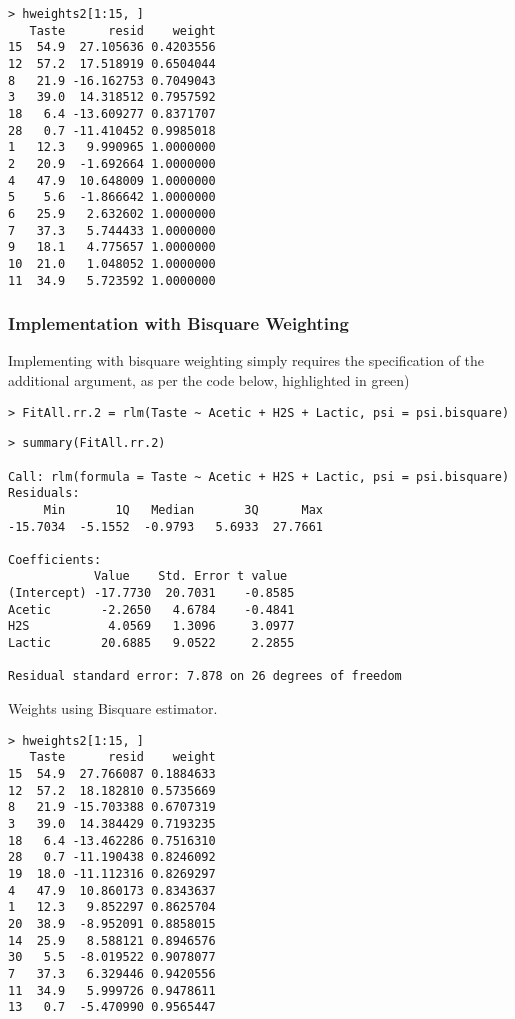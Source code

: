 \begin{verbatim}
> hweights2[1:15, ]
   Taste      resid    weight
15  54.9  27.105636 0.4203556
12  57.2  17.518919 0.6504044
8   21.9 -16.162753 0.7049043
3   39.0  14.318512 0.7957592
18   6.4 -13.609277 0.8371707
28   0.7 -11.410452 0.9985018
1   12.3   9.990965 1.0000000
2   20.9  -1.692664 1.0000000
4   47.9  10.648009 1.0000000
5    5.6  -1.866642 1.0000000
6   25.9   2.632602 1.0000000
7   37.3   5.744433 1.0000000
9   18.1   4.775657 1.0000000
10  21.0   1.048052 1.0000000
11  34.9   5.723592 1.0000000
\end{verbatim}
\subsubsection{Implementation with Bisquare Weighting}
Implementing with bisquare weighting simply requires the specification of the additional argument, as per the code below, highlighted in green)
\begin{framed}
\begin{verbatim}
> FitAll.rr.2 = rlm(Taste ~ Acetic + H2S + Lactic, psi = psi.bisquare)
\end{verbatim}
\end{framed}
\begin{verbatim}
> summary(FitAll.rr.2)

Call: rlm(formula = Taste ~ Acetic + H2S + Lactic, psi = psi.bisquare)
Residuals:
     Min       1Q   Median       3Q      Max 
-15.7034  -5.1552  -0.9793   5.6933  27.7661 

Coefficients:
            Value    Std. Error t value 
(Intercept) -17.7730  20.7031    -0.8585
Acetic       -2.2650   4.6784    -0.4841
H2S           4.0569   1.3096     3.0977
Lactic       20.6885   9.0522     2.2855

Residual standard error: 7.878 on 26 degrees of freedom
\end{verbatim}



Weights using Bisquare estimator.

\begin{verbatim}
> hweights2[1:15, ]
   Taste      resid    weight
15  54.9  27.766087 0.1884633
12  57.2  18.182810 0.5735669
8   21.9 -15.703388 0.6707319
3   39.0  14.384429 0.7193235
18   6.4 -13.462286 0.7516310
28   0.7 -11.190438 0.8246092
19  18.0 -11.112316 0.8269297
4   47.9  10.860173 0.8343637
1   12.3   9.852297 0.8625704
20  38.9  -8.952091 0.8858015
14  25.9   8.588121 0.8946576
30   5.5  -8.019522 0.9078077
7   37.3   6.329446 0.9420556
11  34.9   5.999726 0.9478611
13   0.7  -5.470990 0.9565447
\end{verbatim}

